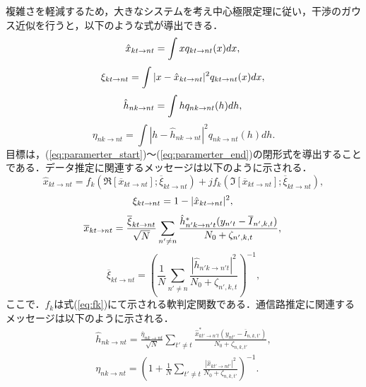 複雑さを軽減するため，大きなシステムを考え中心極限定理に従い，干渉のガウス近似を行うと，以下のような式が導出できる．
\begin{equation} 
	\label{eq:paramerter_start}
	\hat{x}_{kt\to nt} = 
		\int
			xq_{kt\to nt}(x)dx, \\
\end{equation}
\begin{equation} 
	\label{eq:paramerter_second}
	\xi_{kt\to nt} =
		\int
			|x-\hat{x}_{kt\to nt}|^2q_{kt\to nt}(x)dx,\\
\end{equation}
\begin{equation} 
	\hat{h}_{nk\to nt} =
		\int
			hq_{nk\to nt}(h)dh,\\
\end{equation}
\begin{equation} 
	\label{eq:paramerter_end}
	\eta_{nk\to nt} =
		\int
			|h-\hat{h}_{nk\to nt}|^2q_{nk\to nt}(h)dh.
\end{equation}
目標は，(\ref{eq:paramerter_start})～(\ref{eq:paramerter_end})の閉形式を導出することである．データ推定に関連するメッセージは以下のように示される．
\begin{equation}
	\label{eq:x_h_bp}
	\hat{x}_{kt\to nt} = 
		f_{k}(\Re[\overline{x}_{kt\to nt}];\overline{\xi}_{kt\to nt})
		+jf_{k}(\Im[\overline{x}_{kt\to nt}];\overline{\xi}_{kt\to nt}), 
\end{equation}
\begin{equation}
	\label{eq:xi_bp}
	\xi_{kt\to nt} = 1 - |\hat{x}_{kt\to nt}|^2, \\
\end{equation}
\begin{equation}
	\label{eq:x_mean}
	\overline{x}_{kt\to nt}= 
		\frac{\overline{\xi}_{kt\to nt}}{\sqrt{N}}
		\sum_{n'\neq n}
			\frac
				{\hat{h}^{*}_{n'k\to n't}(y_{n't}-\overline{I}_{n',k,t})}
				{N_0+\zeta_{n',k,t}}, \\
\end{equation}
\begin{equation}
	\label{eq:x_var}
	\overline{\xi}_{kt\to nt}=
		\left(
			\frac{1}{N}
			\sum_{n'\neq n}
				\frac
				{|\hat{h}_{n'k\to n't}|^{2}}
				{N_{0}+\zeta_{n',k,t}}
		\right)^{-1},
\end{equation}
ここで．$f_{k}$は式(\ref{eq:fk})にて示される軟判定関数である．通信路推定に関連するメッセージは以下のように示される．
\begin{eqnarray}
	\label{eq:h_h_before}
	\hat{h}_{nk\to nt} =
		\frac{\overline{\eta}_{nk\to nt}}{\sqrt{N}}
		\sum_{t'\neq t}
			\frac
				{\hat{x}^{*}_{kt'\to n't}(y_{nt'}-\overline{I}_{n,k,t'})}
				{N_{0}+\zeta_{n,k,t'}}
			,\\
	\label{eq:h_var}
	\eta_{nk\to nt}=
		\left(
			1+
			\frac{1}{N}
			\sum_{t'\neq t}
				\frac
				{|\hat{x}_{kt'\to nt'}|^{2}}
				{N_{0}+\zeta_{n,k,t'}}
		\right)^{-1}.
\end{eqnarray}
